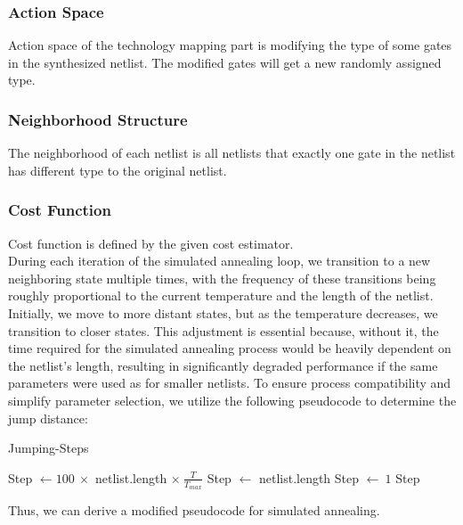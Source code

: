\documentclass[conference]{IEEEtran}
\begin{document}
\subsubsection{Action Space}

Action space of the technology mapping part is modifying the type of some gates in the synthesized netlist. The modified gates will get a new randomly assigned type.

\subsubsection{Neighborhood Structure}

The neighborhood of each netlist is all netlists that exactly one gate in the netlist has different type to the original netlist.

\subsubsection{Cost Function}

Cost function is defined by the given cost estimator.\\

During each iteration of the simulated annealing loop, we transition to a new neighboring state multiple times, with the frequency of these transitions being roughly proportional to the current temperature and the length of the netlist. Initially, we move to more distant states, but as the temperature decreases, we transition to closer states. This adjustment is essential because, without it, the time required for the simulated annealing process would be heavily dependent on the netlist's length, resulting in significantly degraded performance if the same parameters were used as for smaller netlists. To ensure process compatibility and simplify parameter selection, we utilize the following pseudocode to determine the jump distance:
\begin{algorithm}
\begin{algorithmic}[1]
    \caption{Jumping-Steps}\label{euclid}
    \State Step $\gets 100\ \times $ netlist.length $\times\ \frac{T}{T_{max}}$ 
        \State Step $\gets$ netlist.length
        \State Step $\gets \ 1$
    \EndIf
    \State \Return Step
\end{algorithmic}
\end{algorithm}

Thus, we can derive a modified pseudocode for simulated annealing.
\end{document}
